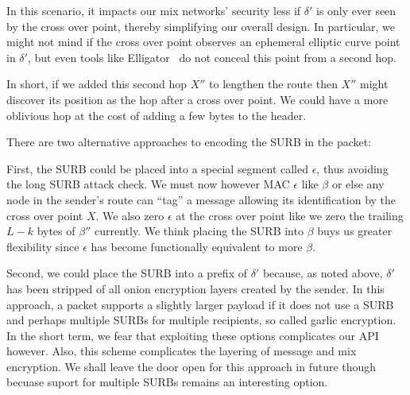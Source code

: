In this scenario, it impacts our mix networks' security less if
$\delta'$ is only ever seen by the cross over point, thereby
simplifying our overall design.   In particular, we might not mind
if the cross over point observes an ephemeral elliptic curve point
in $\delta'$, but even tools like Elligator~\cite{elligator} do not
conceal this point from a second hop.

In short, if we added this second hop $X''$ to lengthen the route
then $X''$ might discover its position as the hop after a cross over
point.  We could have a more oblivious hop at the cost of adding a
few bytes to the header.

\smallskip

There are two alternative approaches to encoding the SURB in the 
packet:  

First, the SURB could be placed into a special segment called
$\epsilon$, thus avoiding the long SURB attack check.
We must now however MAC $\epsilon$ like $\beta$ or else any
node in the sender's route can ``tag'' a message allowing its
identification by the cross over point $X$.  We also zero
$\epsilon$ at the cross over point like we zero the trailing
$L-k$ bytes of $\beta''$ currently.  We think placing the SURB
into $\beta$ buys us greater flexibility since $\epsilon$ has become
functionally equivalent to more $\beta$.

Second, we could place the SURB into a prefix of $\delta'$ because,
as noted above, $\delta'$ has been stripped of all onion encryption
layers created by the sender.  In this approach, a packet supports
a slightly larger payload if it does not use a SURB and perhaps
multiple SURBs for multiple recipients, so called garlic encryption.
In the short term, we fear that exploiting these options complicates
our API however.  Also, this scheme complicates the layering of
message and mix encryption.  We shall leave the door open for this
approach in future though becuase suport for multiple SURBs remains
an interesting option.





